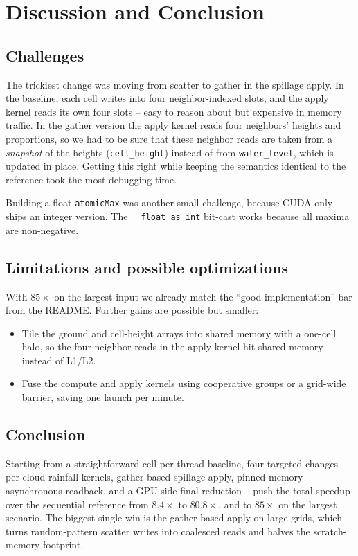 \documentclass[sigconf, nonacm, review]{acmart}
\begin{document}
\section{Discussion and Conclusion}\label{sec:disc}

\subsection{Challenges}
The trickiest change was moving from scatter to gather in the
spillage apply. In the baseline, each cell writes into four
neighbor-indexed slots, and the apply kernel reads its own four
slots -- easy to reason about but expensive in memory traffic.
In the gather version the apply kernel reads four neighbors'
heights and proportions, so we had to be sure that these
neighbor reads are taken from a \emph{snapshot} of the heights
(\texttt{cell\_height}) instead of from \texttt{water\_level},
which is updated in place. Getting this right while keeping the
semantics identical to the reference took the most debugging
time.

Building a float \texttt{atomicMax} was another small challenge,
because CUDA only ships an integer version. The
\texttt{\_\_float\_as\_int} bit-cast works because all maxima
are non-negative.

\subsection{Limitations and possible optimizations}
With $85\times$ on the largest input we already match the
``good implementation'' bar from the README. Further gains are
possible but smaller:

\begin{itemize}
  \item Tile the ground and cell-height arrays into shared memory
    with a one-cell halo, so the four neighbor reads in the apply
    kernel hit shared memory instead of L1/L2.
  \item Fuse the compute and apply kernels using cooperative
    groups or a grid-wide barrier, saving one launch per minute.
\end{itemize}

\subsection{Conclusion}
Starting from a straightforward cell-per-thread baseline, four
targeted changes -- per-cloud rainfall kernels, gather-based
spillage apply, pinned-memory asynchronous readback, and a
GPU-side final reduction -- push the total speedup over the
sequential reference from $8.4\times$ to $80.8\times$, and to
$85\times$ on the largest scenario. The biggest single win is
the gather-based apply on large grids, which turns random-pattern
scatter writes into coalesced reads and halves the scratch-memory
footprint.
\end{document}

